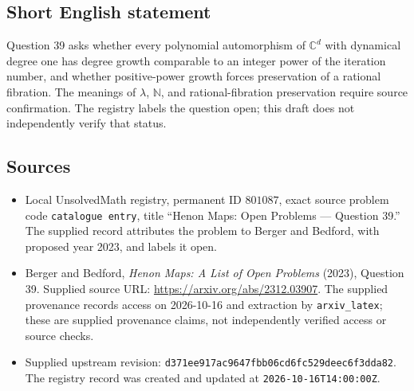 \documentclass[11pt]{article}
\newcommand{\N}{\mathbb{N}}
\newcommand{\C}{\mathbb{C}}
\begin{document}
\subsection{Short English statement}
Question 39 asks whether every polynomial automorphism of \(\C^d\) with dynamical degree one has degree growth comparable to an integer power of the iteration number, and whether positive-power growth forces preservation of a rational fibration. The meanings of \(\lambda\), \(\N\), and rational-fibration preservation require source confirmation. The registry labels the question open; this draft does not independently verify that status.
\subsection{Sources}
\begin{itemize}
\item Local UnsolvedMath registry, permanent ID \(801087\), exact source problem code \texttt{catalogue entry}, title ``Henon Maps: Open Problems --- Question 39.'' The supplied record attributes the problem to Berger and Bedford, with proposed year 2023, and labels it open.
\item Berger and Bedford, \emph{Henon Maps: A List of Open Problems} (2023), Question 39. Supplied source URL: \url{https://arxiv.org/abs/2312.03907}. The supplied provenance records access on 2026-10-16 and extraction by \texttt{arxiv\_latex}; these are supplied provenance claims, not independently verified access or source checks.
\item Supplied upstream revision: \texttt{d371ee917ac9647fbb06cd6fc529deec6f3dda82}. The registry record was created and updated at \texttt{2026-10-16T14:00:00Z}.
\end{itemize}
\end{document}
